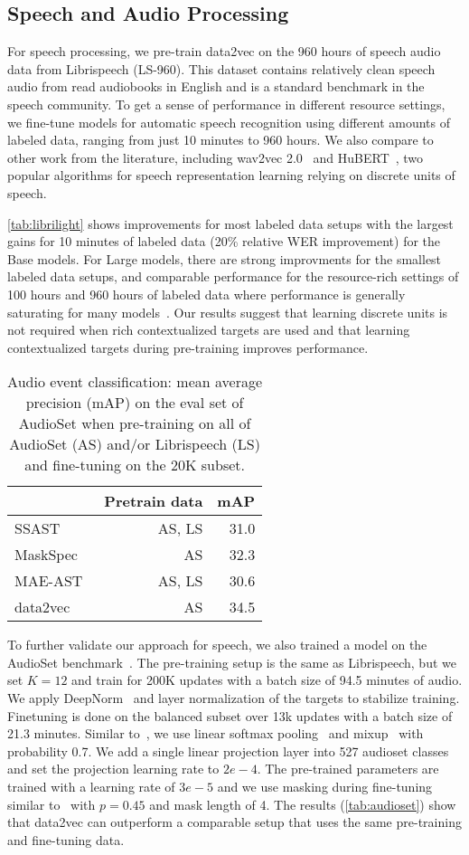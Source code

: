 \documentclass[nohyperref]{article}
\theoremstyle{plain}
\theoremstyle{definition}
\theoremstyle{remark}
\newcommand{\name}{data2vec}
\newcommand{\wvpp}{wav2vec 2.0}
\newcommand{\libri}{Librispeech}
\newcommand{\librisz}{LS-960}
\newcommand{\insertAStable}{
\begin{table}[h!]
\caption{Audio event classification: mean average precision (mAP) on the eval set of AudioSet when pre-training on all of AudioSet (AS) and/or Librispeech (LS) and fine-tuning on the 20K subset.
\label{tab:audioset}
}
\vspace{0.075in}
\centering 
\begin{tabular}{lrr}
\toprule
 & Pretrain data & mAP \\
\midrule
SSAST~\citep{gong2021ssast} & AS, LS & 31.0 \\
MaskSpec~\citep{chong2022maskspec} & AS & 32.3 \\
MAE-AST~\citep{baade2022} & AS, LS & 30.6 \\
\midrule
data2vec & AS & 34.5 \\
\bottomrule
\end{tabular}
\end{table}
}
\begin{document}
\subsection{Speech and Audio Processing}
\label{sec:results_speech}

For speech processing, we pre-train \name{} on the 960 hours of speech audio data from \libri{} (\librisz{}). 
This dataset contains relatively clean speech audio from read audiobooks in English and is a standard benchmark in the speech community.
To get a sense of performance in different resource settings, we fine-tune models for automatic speech recognition using different amounts of labeled data, ranging from just 10 minutes to 960 hours.
We also compare to other work from the literature, including \wvpp{}~\citep{baevski2020wav} and HuBERT~\citep{hsu2020hubert}, two popular algorithms for speech representation learning relying on discrete units of speech.


\autoref{tab:librilight} shows improvements for most labeled data setups with the largest gains for 10 minutes of labeled data (20\% relative WER improvement) for the Base models.
For Large models, there are strong improvments for the smallest labeled data setups, and comparable performance for the resource-rich settings of 100 hours and 960 hours of labeled data where performance is generally saturating for many models~\citep{zhang2020pushing,chung2021w2vbert}.
Our results suggest that learning discrete units is not required when rich contextualized targets are used and that learning contextualized targets during pre-training improves performance.

\insertAStable

To further validate our approach for speech, we also trained a model on the AudioSet benchmark~\citep{gemmeke2017audioset}. 
The pre-training setup is the same as Librispeech, but we set $K=12$ and train for 200K updates with a batch size of 94.5 minutes of audio. 
We apply DeepNorm~\citep{wang2022deepnorm} and layer normalization of the targets to stabilize training. 
Finetuning is done on the balanced subset over 13k updates with a batch size of 21.3 minutes. 
Similar to~\citet{srivistava2021nonspeech}, we use linear softmax pooling~\citep{wang2018linsoftmax} and mixup~\citep{tokozume2017mixup} with probability 0.7. 
We add a single linear projection layer into 527 audioset classes and set the projection learning rate to $2e-4$. 
The pre-trained parameters are trained with a learning rate of $3e-5$ and we use masking during fine-tuning similar to~\citet{baevski2020wav} with $p=0.45$ and mask length of 4. 
The results (\autoref{tab:audioset}) show that data2vec can outperform a comparable setup that uses the same pre-training and fine-tuning data.
\end{document}
